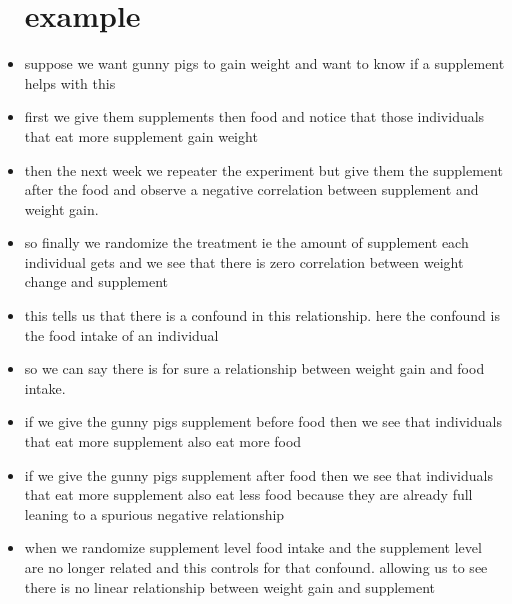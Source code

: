 \documentclass{article}
\begin{document}
\begin{itemize}
\section{example}
\item suppose we want gunny pigs to gain weight and want to know if a supplement helps with this 
\item first we give them supplements then food and notice that those individuals that eat more supplement gain weight 
\item then the next week we repeater the experiment but give them the supplement after the  food and observe a negative correlation between supplement and weight gain.
\item so finally we randomize the treatment ie the amount of supplement each individual gets and we see that there is zero correlation between weight change and supplement 
\item this tells us that there is a confound in this relationship. here the confound is the food intake of an individual
\item so we can say there is for sure a relationship between weight gain and food intake. 
\item if we give the gunny pigs supplement before food then we see that individuals that eat more supplement also eat more food
\item if we give the gunny pigs supplement after food then we see that individuals that eat more supplement also eat less food because they are already full leaning to a spurious negative relationship
\item when we randomize supplement level food intake and the supplement level are no longer related and this controls for that confound. allowing us to see there is no linear relationship between weight gain and supplement 

\end{itemize}
\end{document}
